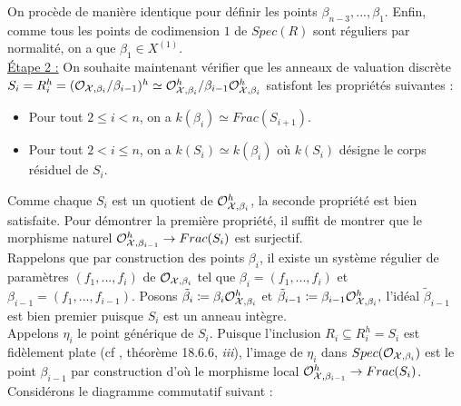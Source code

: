 \documentclass[11pt]{article}
\begin{document}
On procède de manière identique pour définir les points $\beta_{n-3},...,\beta_{1}$. Enfin, comme tous les points de codimension $1$ de $Spec(R)$ sont réguliers par normalité, on a que $\beta_1 \in X^{(1)}$.\\

\underline{Étape 2 :} On souhaite maintenant vérifier que les anneaux de valuation discrète $S_i = R_i^h = (\mathcal{O}_{\mathcal{X},\beta_{i}}/\beta_{i-1})^h \simeq \mathcal{O}_{\mathcal{X},\beta_{i}}^h/\beta_{i-1}\mathcal{O}_{\mathcal{X},\beta_{i}}^h$ satisfont les propriétés suivantes :
\begin{itemize}
    \item Pour tout $2\leq i < n$, on a  $k(\beta_i) \simeq Frac(S_{i+1})$.
    \item  Pour tout $2 < i \leq n$, on a $k(S_i) \simeq k(\beta_i)$ où $k(S_i)$ désigne le corps résiduel de $S_i$.
\end{itemize}

Comme chaque $S_i$ est un quotient de $\mathcal{O}_{\mathcal{X}, \beta_i}^h$, la seconde propriété est bien satisfaite. Pour démontrer la première propriété, il suffit de montrer que le morphisme naturel $\mathcal{O}_{\mathcal{X}, \beta_{i-1}}^h \rightarrow Frac(S_i)$ est surjectif.\\

Rappelons que par construction des points $\beta_i$, il existe un système régulier de paramètres $(f_1,...,f_i)$ de $\mathcal{O}_{\mathcal{X},\beta_{i}}$ tel que $\beta_i = (f_1,...,f_i)$ et $\beta_{i-1} = (f_1,...,f_{i-1})$.
Posons $\tilde{\beta}_{i} \coloneqq \beta_{i} \CO_{\CX,\beta_i}^h$ et $\tilde{\beta}_{i-1} \coloneqq \beta_{i-1} \CO_{\CX,\beta_i}^h,$ l'idéal $\tilde{\beta}_{i-1}$ est bien premier puisque $S_i$ est un anneau intègre.\\
Appelons $\eta_i$ le point générique de $S_i$. Puisque l'inclusion $R_i \subseteq R_i^h = S_i$ est fidèlement plate (cf \cite{PMIHES_1967__32__5_0}, théorème 18.6.6, \textit{iii}), l'image de $\eta_i$ dans $Spec(\mathcal{O}_{\mathcal{X},\beta_i})$ est le point $\beta_{i-1}$ par construction d'où le morphisme local $\mathcal{O}_{\mathcal{X}, \beta_{i-1}}^h \rightarrow Frac(S_i)$. Considérons le diagramme commutatif suivant :
\end{document}
